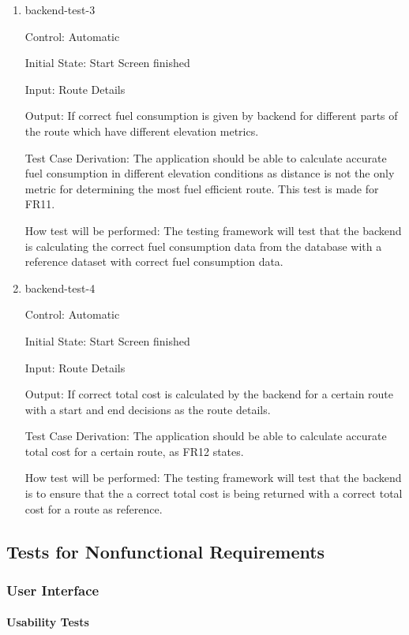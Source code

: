 \documentclass[12pt, titlepage]{article}
\begin{document}
\begin{enumerate}
\item{backend-test-3\\}

Control: Automatic
					
Initial State: Start Screen finished
					
Input: Route Details
					
Output: If correct fuel consumption is given by backend for different parts of the route which have different elevation metrics.

Test Case Derivation: The application should be able to calculate accurate fuel consumption in different elevation conditions as 
distance is not the only metric for determining the most fuel efficient route. This test is made for FR11.
					
How test will be performed: The testing framework will test that the backend is calculating the correct fuel consumption data from the database 
with a reference dataset with correct fuel consumption data.
					
\item{backend-test-4\\}

Control: Automatic
					
Initial State: Start Screen finished
					
Input: Route Details
					
Output: If correct total cost is calculated by the backend for a certain route with a start and end decisions as the route details.

Test Case Derivation: The application should be able to calculate accurate total cost for a certain route, as FR12 states.
					
How test will be performed: The testing framework will test that the backend is to ensure that the a correct total cost is being returned 
with a correct total cost for a route as reference.

\end{enumerate}

\subsection{Tests for Nonfunctional Requirements} \label{NFR}

\subsubsection{User Interface}
		
\paragraph{Usability Tests}
\end{document}
